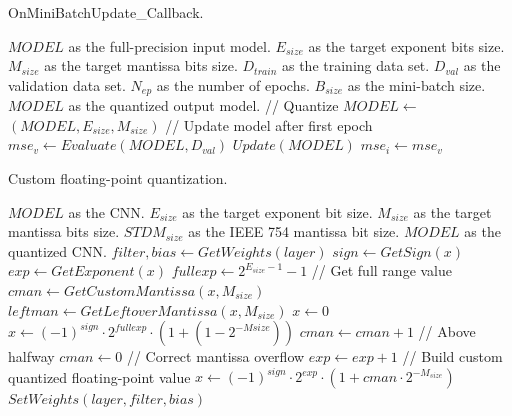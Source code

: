 \begin{algorithm}[h!]
	\caption{OnMiniBatchUpdate\_Callback.}
	\label{alg:quantization_integration}
	\begin{algorithmic}[1]
		\SetAlgoLined
		\renewcommand{\algorithmicrequire}{\textbf{input:}}
		\renewcommand{\algorithmicensure}{\textbf{output:}}
		\REQUIRE $MODEL$ as the full-precision input model.
		\REQUIRE $E_{size}$ as the target exponent bits size.
		\REQUIRE $M_{size}$ as the target mantissa bits size.
		\REQUIRE $D_{train}$ as the training data set.
		\REQUIRE $D_{val}$ as the validation data set.
		\REQUIRE $N_{ep}$ as the number of epochs.
		\REQUIRE $B_{size}$ as the mini-batch size.
		\ENSURE $MODEL$ as the quantized output model.
		\STATE // Quantize
		\STATE $MODEL \gets$ $(MODEL,E_{size}, M_{size})$ 
		\STATE // Update model after first epoch
		\STATE $mse_v \gets Evaluate(MODEL, D_{val})$
		\STATE $Update(MODEL)$
		\STATE $mse_i \gets mse_v$
		\ENDIF
		\ENDIF
	\end{algorithmic}
\end{algorithm}

\begin{algorithm}[h!]
	\caption{Custom floating-point quantization.}
	\label{alg:quantize_training}
	\begin{algorithmic}[1]
		\SetAlgoLined
		\renewcommand{\algorithmicrequire}{\textbf{input:}}
		\renewcommand{\algorithmicensure}{\textbf{output:}}
		\REQUIRE $MODEL$ as the CNN.
		\REQUIRE $E_{size}$ as the target exponent bit size.
		\REQUIRE $M_{size}$ as the target mantissa bits size.
		\REQUIRE $STDM_{size}$ as the IEEE 754 mantissa bit size.
		\ENSURE $MODEL$ as the quantized CNN.
		\STATE $filter, bias \gets GetWeights(layer)$
			\STATE $sign \gets GetSign(x)$
			\STATE $exp \gets GetExponent(x)$
			\STATE $fullexp \gets 2^{E_{size}-1}-1$ // Get full range value
			\STATE $cman \gets GetCustomMantissa(x, M_{size})$
			\STATE $leftman \gets GetLeftoverMantissa(x, M_{size})$
				\STATE$x\gets0$
				\STATE$x\gets (-1)^{sign}\cdot2^{fullexp}\cdot(1+(1-2^{-M{size}}))$
			\ELSE
					\STATE $cman \gets cman+1$ // Above halfway
					\STATE $cman \gets 0$ // Correct mantissa overflow
					\STATE $exp \gets exp + 1$
					\ENDIF
				\ENDIF
				\STATE // Build custom quantized floating-point value
				\STATE$x\gets (-1)^{sign}\cdot2^{exp}\cdot(1+cman\cdot2^{-M_{size}})$
			\ENDIF
		\ENDFOR
		\STATE $SetWeights(layer, filter, bias)$
		\ENDIF
		\ENDFOR
	\end{algorithmic}
\end{algorithm}

